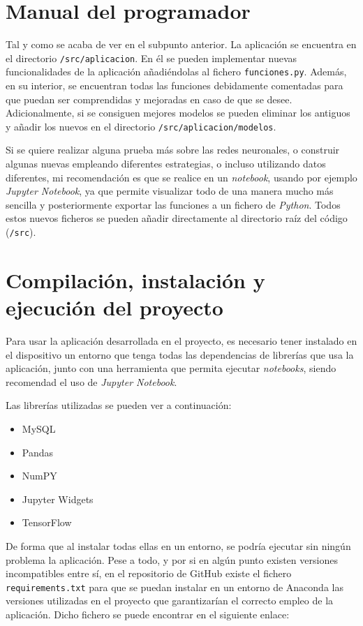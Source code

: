 \section{Manual del programador}
Tal y como se acaba de ver en el subpunto anterior. La aplicación se encuentra en el directorio \texttt{/src/aplicacion}. En él se pueden implementar nuevas funcionalidades de la aplicación añadiéndolas al fichero \texttt{funciones.py}. Además, en su interior, se encuentran todas las funciones debidamente comentadas para que puedan ser comprendidas y mejoradas en caso de que se desee. Adicionalmente, si se consiguen mejores modelos se pueden eliminar los antiguos y añadir los nuevos en el directorio \texttt{/src/aplicacion/modelos}.

Si se quiere realizar alguna prueba más sobre las redes neuronales, o construir algunas nuevas empleando diferentes estrategias, o incluso utilizando datos diferentes, mi recomendación es que se realice en un \emph{notebook}, usando por ejemplo \emph{Jupyter Notebook}, ya que permite visualizar todo de una manera mucho más sencilla y posteriormente exportar las funciones a un fichero de \emph{Python}. Todos estos nuevos ficheros se pueden añadir directamente al directorio raíz del código (\texttt{/src}).

\section{Compilación, instalación y ejecución del proyecto}
Para usar la aplicación desarrollada en el proyecto, es necesario tener instalado en el dispositivo un entorno que tenga todas las dependencias de librerías que usa la aplicación, junto con una herramienta que permita ejecutar \emph{notebooks}, siendo recomendad el uso de \emph{Jupyter Notebook}.

Las librerías utilizadas se pueden ver a continuación:
\begin{itemize}
    \item MySQL
    \item Pandas
    \item NumPY
    \item Jupyter Widgets
    \item TensorFlow
\end{itemize}

De forma que al instalar todas ellas en un entorno, se podría ejecutar sin ningún problema la aplicación. Pese a todo, y por si en algún punto existen versiones incompatibles entre sí, en el repositorio de GitHub existe el fichero \texttt{requirements.txt} para que se puedan instalar en un entorno de Anaconda las versiones utilizadas en el proyecto que garantizarían el correcto empleo de la aplicación. Dicho fichero se puede encontrar en el siguiente enlace:

